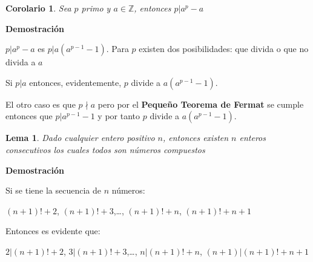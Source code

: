 \documentclass[a4paper,12pt]{report}
\newtheorem*{cor}{Corolario}
\newtheorem*{lem}{Lema}
\begin{document}

\begin{cor}
 Sea $p$ primo y $a\in\mathbb{Z}$, entonces $p|a^p-a$
\end{cor}

\textbf{Demostración}

$p|a^p-a$ es $p|a(a^{p-1}-1)$. Para $p$ existen dos posibilidades: que divida o que no divida a $a$

Si $p|a$ entonces, evidentemente, $p$ divide a $a(a^{p-1}-1)$. 

El otro caso es que $p \nmid a$ pero por el \textbf{Pequeño Teorema de Fermat} se cumple entonces que $p|a^{p-1}-1$ y por tanto $p$ divide a $a(a^{p-1}-1)$.


\begin{lem}
Dado cualquier entero positivo $n$, entonces existen $n$ enteros consecutivos los cuales todos son números compuestos
\end{lem}

\textbf{Demostración}

Si se tiene la secuencia de $n$ números: 

$(n+1)!+2$, $(n+1)!+3$,\dots , $(n+1)!+n$, $(n+1)!+n+1$ 

Entonces es evidente que:

$2|(n+1)!+2$, $3|(n+1)!+3$,\dots , $n|(n+1)!+n$, $(n+1)|(n+1)!+n+1$
\end{document}
